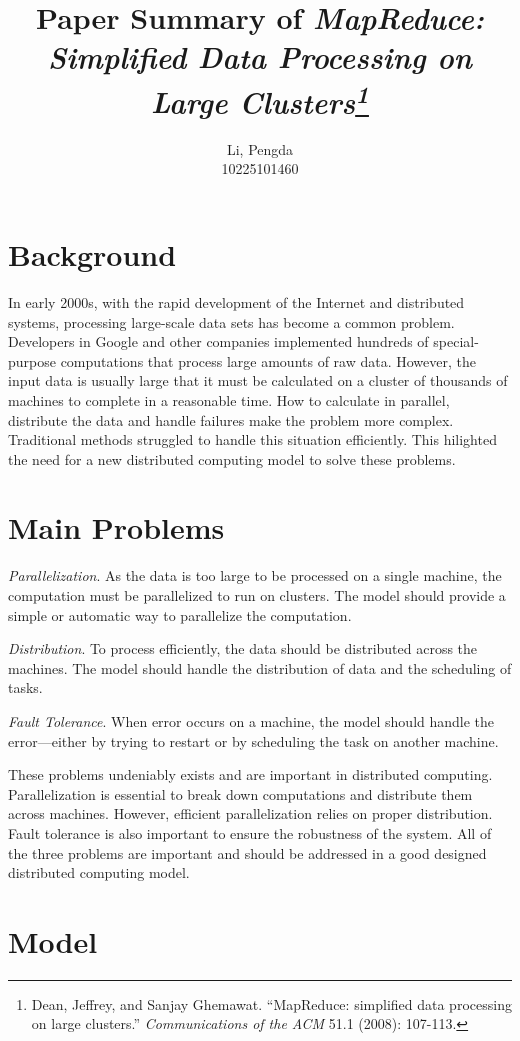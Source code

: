 \documentclass[10pt]{article}
\title{Paper Summary of \textit{MapReduce: Simplified Data Processing on Large Clusters\footnote{Dean, Jeffrey, and Sanjay Ghemawat. ``MapReduce: simplified data processing on large clusters.'' \textit{Communications of the ACM} 51.1 (2008): 107-113.}}}
\author{Li, Pengda \\[-0.5em] \small{10225101460}}
\date{}
\begin{document}
\maketitle

\section{Background}

In early 2000s, with the rapid development of the Internet and distributed systems, processing large-scale data sets has become a common problem. 
Developers in Google and other companies implemented hundreds of special-purpose computations that process large amounts of raw data.
However, the input data is usually large that it must be calculated on a cluster of thousands of machines to complete in a reasonable time.
How to calculate in parallel, distribute the data and handle failures make the problem more complex.
Traditional methods struggled to handle this situation efficiently.
This hilighted the need for a new distributed computing model to solve these problems.  


\section{Main Problems}

\textit{Parallelization}. As the data is too large to be processed on a single machine, the computation must be parallelized to run on clusters. The model should provide a simple or automatic way to parallelize the computation.

\textit{Distribution}. To process efficiently, the data should be distributed across the machines. The model should handle the distribution of data and the scheduling of tasks.

\textit{Fault Tolerance}. When error occurs on a machine, the model should handle the error---either by trying to restart or by scheduling the task on another machine.

These problems undeniably exists and are important in distributed computing.
Parallelization is essential to break down computations and distribute them across machines.
However, efficient parallelization relies on proper distribution. 
Fault tolerance is also important to ensure the robustness of the system.
All of the three problems are important and should be addressed in a good designed distributed computing model.

\section{Model}
\end{document}

